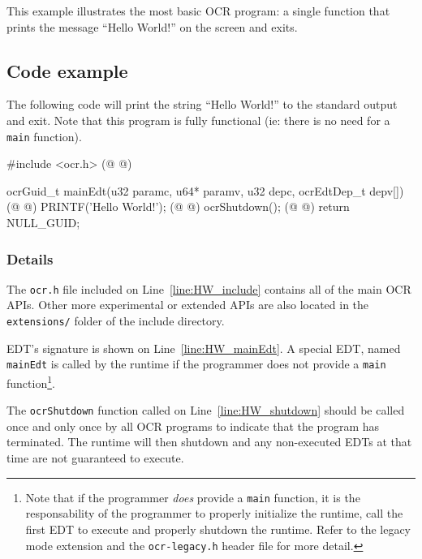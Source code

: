 This example illustrates the most basic OCR program: a single function
that prints the message ``Hello World!'' on the screen and exits.
\subsection{Code example}
The following code will print the string ``Hello World!'' to the
standard output and exit. Note that this program is fully functional
(ie: there is no need for a \texttt{main} function).

\begin{ocrsnip}
#include <ocr.h> (@ \label{line:HW_include} @)

ocrGuid_t mainEdt(u32 paramc, u64* paramv, u32 depc, ocrEdtDep_t depv[]) { (@ \label{line:HW_mainEdt} @)
    PRINTF('Hello World!\n'); (@ \label{line:HW_printf}@)
    ocrShutdown(); (@ \label{line:HW_shutdown}@)
    return NULL_GUID;
}
\end{ocrsnip}
\subsubsection{Details}
The \texttt{ocr.h} file included on Line~\ref{line:HW_include}
contains all of the main OCR APIs. Other more experimental or extended
APIs are also located in the \texttt{extensions/} folder of the
include directory.

EDT's signature is shown on Line~\ref{line:HW_mainEdt}. A special EDT,
named \texttt{mainEdt} is called by the runtime if the programmer does not
provide a \texttt{main} function\footnote{Note that if the programmer
  \emph{does} provide a \texttt{main} function, it is the
  responsability of the programmer to properly initialize the runtime,
  call the first EDT to execute and properly shutdown the
  runtime. Refer to the legacy mode extension and the
  \texttt{ocr-legacy.h} header file for more detail.}.

The \texttt{ocrShutdown} function called on
Line~\ref{line:HW_shutdown} should be called once and only once by all
OCR programs to indicate that the program has terminated. The runtime
will then shutdown and any non-executed EDTs at that time are not
guaranteed to execute.
